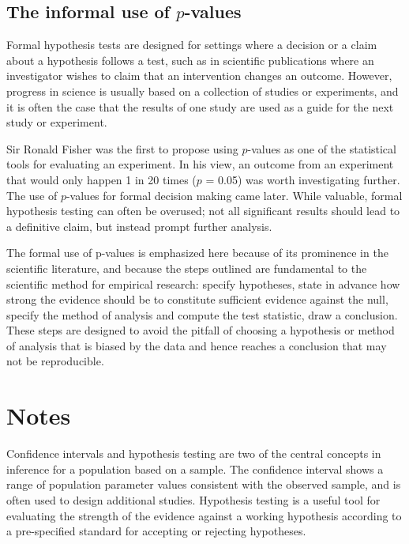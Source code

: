


\subsection{The informal use of $p$-values}
\label{informalUseOfp-values}

Formal hypothesis tests are designed for settings where a decision or a claim about a hypothesis follows a test, such as in scientific publications where an investigator wishes to claim that an intervention changes an outcome.  However, progress in science is usually based on a collection of studies or experiments, and it is often the case that the results of one study are used as a guide for the next study or experiment. 

Sir Ronald Fisher was the first to propose using $p$-values as one of the statistical tools for evaluating an experiment.  In his view, an outcome from an experiment that would only happen 1 in 20 times ($p$ = 0.05) was worth investigating further. The use of $p$-values for formal decision making came later.  While valuable, formal hypothesis testing can often be overused; not all significant results should lead to a definitive claim, but instead prompt further analysis.

The formal use of p-values is emphasized here because of its prominence in the scientific literature, and because the steps outlined are fundamental to the scientific method for empirical research: specify hypotheses, state in advance how strong the evidence should be to constitute sufficient evidence against the null, specify the method of analysis and compute the test statistic, draw a conclusion. These steps are designed to avoid the pitfall of choosing a hypothesis or method of analysis that is biased by the data and hence reaches a conclusion that may not be reproducible.


\section{Notes}
\label{ch4Summary}

Confidence intervals and hypothesis testing are two of the central concepts in inference for a population based on a sample. The confidence interval shows a range of population parameter values consistent with the observed sample, and is often used to design additional studies. Hypothesis testing is a useful tool for evaluating the strength of the evidence against a working hypothesis according to a pre-specified standard for accepting or rejecting hypotheses.

